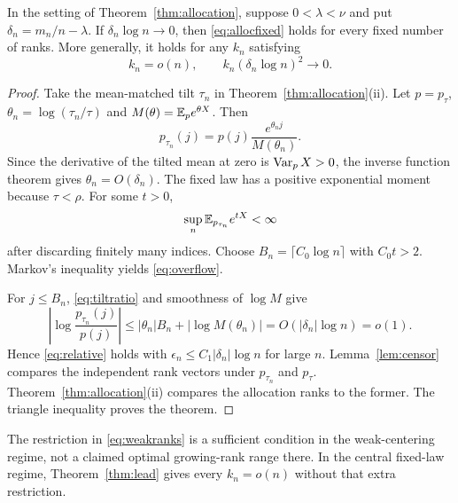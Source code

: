 \begin{theorem}\label{thm:weak}
In the setting of Theorem~\ref{thm:allocation}, suppose $0<\lambda<\nu$ and put $\delta_n=m_n/n-\lambda$. If $\delta_n\log n\to0$, then \eqref{eq:allocfixed} holds for every fixed number of ranks. More generally, it holds for any $k_n$ satisfying
\begin{equation}\label{eq:weakranks}
 k_n=o(n),\qquad k_n(\delta_n\log n)^2\longrightarrow0.
\end{equation}
\end{theorem}
\begin{proof}
Take the mean-matched tilt $\tau_n$ in Theorem~\ref{thm:allocation}(ii). Let $p=p_\tau$, $\theta_n=\log(\tau_n/\tau)$ and $M(\theta)=\mathbb E_p e^{\theta X}$. Then
\begin{equation}\label{eq:tiltratio}
 p_{\tau_n}(j)=p(j)\frac{e^{\theta_nj}}{M(\theta_n)}.
\end{equation}
Since the derivative of the tilted mean at zero is $\operatorname{Var}_pX>0$, the inverse function theorem gives $\theta_n=O(\delta_n)$. The fixed law has a positive exponential moment because $\tau<\rho$. For some $t>0$,
\[
 \sup_n\mathbb E_{p_{\tau_n}}e^{tX}<\infty
\]
after discarding finitely many indices. Choose $B_n=\lceil C_0\log n\rceil$ with $C_0t>2$. Markov's inequality yields \eqref{eq:overflow}.

For $j\le B_n$, \eqref{eq:tiltratio} and smoothness of $\log M$ give
\[
 \left|\log\frac{p_{\tau_n}(j)}{p(j)}\right|
 \le |\theta_n|B_n+|\log M(\theta_n)|
 =O(|\delta_n|\log n)=o(1).
\]
Hence \eqref{eq:relative} holds with $\epsilon_n\le C_1|\delta_n|\log n$ for large $n$. Lemma~\ref{lem:censor} compares the independent rank vectors under $p_{\tau_n}$ and $p_\tau$. Theorem~\ref{thm:allocation}(ii) compares the allocation ranks to the former. The triangle inequality proves the theorem.
\end{proof}
\begin{remark}
The restriction in \eqref{eq:weakranks} is a sufficient condition in the weak-centering regime, not a claimed optimal growing-rank range there. In the central fixed-law regime, Theorem~\ref{thm:lead} gives every $k_n=o(n)$ without that extra restriction.
\end{remark}

